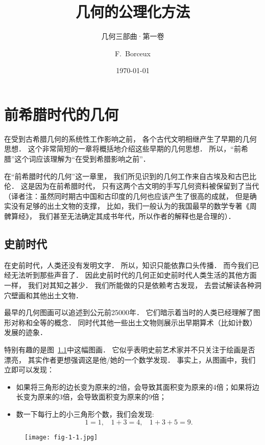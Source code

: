 \documentclass[cn,fancy,blue,11pt]{elegantbook}
\title{几何的公理化方法}
\subtitle{几何三部曲·第一卷}
\author{F.~Borceux}
\institute{山东理工大学}
\date{\today}
\begin{document}
\maketitle

\tableofcontents

\mainmatter
\hypersetup{pageanchor=true}

\chapter{前希腊时代的几何}

在受到古希腊几何的系统性工作影响之前，
各个古代文明相继产生了早期的几何思想．
这个非常简短的一章将概括地介绍这些早期的几何思想．
所以，``前希腊''这个词应该理解为``在受到希腊影响之前''．

在``前希腊时代的几何''这一章里，
我们所见识到的几何工作来自古埃及和古巴比伦．
这是因为在前希腊时代，
只有这两个古文明的手写几何资料被保留到了当代
（译者注：虽然同时期古中国和古印度的几何也应该产生了很高的成就，
但是确实没有足够的出土文物的支撑，
比如，我们一般认为的我国最早的数学专著《周髀算经》，
我们甚至无法确定其成书年代，所以作者的解释也是合理的）．

\section{史前时代}

在史前时代，人类还没有发明文字．
所以，知识只能依靠口头传播．
而今我们已经无法听到那些声音了．
因此史前时代的几何正如史前时代人类生活的其他方面一样，
我们对其知之甚少．
我们所能做的只是依赖考古发现，
去尝试解读各种洞穴壁画和其他出土文物．

最早的几何图画可以追述到公元前25000年．
它们暗示着当时的人类已经理解了图形对称和全等的概念．
同时代其他一些出土文物则展示出早期算术（比如计数）发展的迹象．

特别有趣的是图~\ref{fig:1-1}中这幅图画．
它似乎表明史前艺术家并不只关注于绘画是否漂亮，
其实作者更想强调这是他/她的一个数学发现．
事实上，从图画中，我们立即可以发现：
\begin{itemize}
	\item 如果将三角形的边长变为原来的2倍，会导致其面积变为原来的4倍；如果将边长变为原来的3倍，会导致面积变为原来的9倍；
	\item 数一下每行上的小三角形个数，我们会发现:\[1=1,~~~~1+3=4,~~~~1+3+5=9.\]
\end{itemize}

\begin{figure}[htbp]
	\centering
	\texttt{[image: fig-1-1.jpg]}
	\caption{\label{fig:1-1}}
\end{figure}
\end{document}
